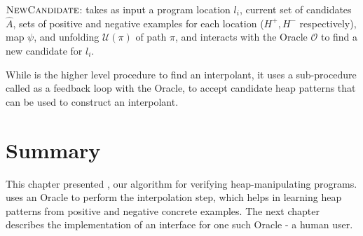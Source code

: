 \begin{algorithm}[ht]


  \caption{$\textsc{NewCandidate}$: takes as input a program location $l_i$, current set of candidates $\hat{A}$, sets of positive and negative examples for each location ($H^{+}, H^{-}$ respectively), map $\psi$, and unfolding $\mathcal{U}(\pi)$ of path $\pi$, and interacts with the Oracle $\mathcal{O}$ to find a new candidate for $l_i$.}
  \label{alg:newcandidate}
\end{algorithm}

While \seplearner is the higher level procedure to find an interpolant, it uses a sub-procedure called \newcandidate as a feedback loop with the Oracle, to accept candidate heap patterns that can be used to construct an interpolant.

\section*{Summary}
This chapter presented \verifier, our algorithm for verifying heap-manipulating programs. \verifier uses an Oracle to perform the interpolation step, which helps in learning heap patterns from positive and negative concrete examples. The next chapter describes the implementation of an interface for one such Oracle - a human user.